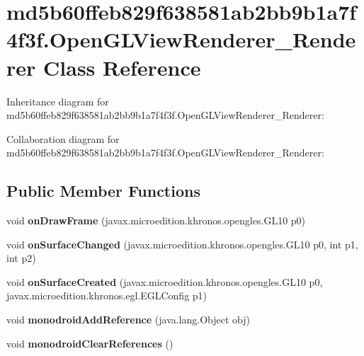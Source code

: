 \hypertarget{classmd5b60ffeb829f638581ab2bb9b1a7f4f3f_1_1_open_g_l_view_renderer___renderer}{}\section{md5b60ffeb829f638581ab2bb9b1a7f4f3f.\+Open\+G\+L\+View\+Renderer\+\_\+\+Renderer Class Reference}
\label{classmd5b60ffeb829f638581ab2bb9b1a7f4f3f_1_1_open_g_l_view_renderer___renderer}


Inheritance diagram for md5b60ffeb829f638581ab2bb9b1a7f4f3f.\+Open\+G\+L\+View\+Renderer\+\_\+\+Renderer\+:


Collaboration diagram for md5b60ffeb829f638581ab2bb9b1a7f4f3f.\+Open\+G\+L\+View\+Renderer\+\_\+\+Renderer\+:
\subsection*{Public Member Functions}
\begin{DoxyCompactItemize}
\item 
\mbox{\label{classmd5b60ffeb829f638581ab2bb9b1a7f4f3f_1_1_open_g_l_view_renderer___renderer_a13437d07738622115709479669ef46a0}} 
void {\bfseries on\+Draw\+Frame} (javax.\+microedition.\+khronos.\+opengles.\+G\+L10 p0)
\item 
\mbox{\label{classmd5b60ffeb829f638581ab2bb9b1a7f4f3f_1_1_open_g_l_view_renderer___renderer_a6ec5c9b9fc4c374d02ce3788d6ad6a64}} 
void {\bfseries on\+Surface\+Changed} (javax.\+microedition.\+khronos.\+opengles.\+G\+L10 p0, int p1, int p2)
\item 
\mbox{\label{classmd5b60ffeb829f638581ab2bb9b1a7f4f3f_1_1_open_g_l_view_renderer___renderer_a7232536fa62d31b5e230568c18189110}} 
void {\bfseries on\+Surface\+Created} (javax.\+microedition.\+khronos.\+opengles.\+G\+L10 p0, javax.\+microedition.\+khronos.\+egl.\+E\+G\+L\+Config p1)
\item 
\mbox{\label{classmd5b60ffeb829f638581ab2bb9b1a7f4f3f_1_1_open_g_l_view_renderer___renderer_abd5994165886f576dadade7f97fa0317}} 
void {\bfseries monodroid\+Add\+Reference} (java.\+lang.\+Object obj)
\item 
\mbox{\label{classmd5b60ffeb829f638581ab2bb9b1a7f4f3f_1_1_open_g_l_view_renderer___renderer_ac2a1d806a5c6a2de5728d94cd3894aa8}} 
void {\bfseries monodroid\+Clear\+References} ()
\end{DoxyCompactItemize}
